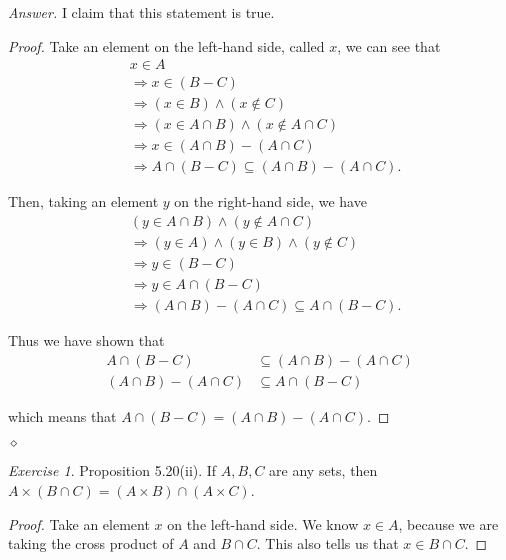 \documentclass[12pt,oneside]{amsart}
\theoremstyle{remark}
\newtheorem{exer}{Exercise}
\newenvironment{answer}{\bigskip\noindent\emph{Answer.}}{\hfill$\diamond$\newline}
\begin{document}
\begin{answer}
I claim that this statement is true.

\begin{proof}
Take an element on the left-hand side, called $x$, we can see that
\begin{align*}
&x \in A \tag{because $x \in A \cap (B - C)$} \\
&\Rightarrow  x \in (B - C) \tag{definition of $\cap$} \\
&\Rightarrow (x \in B) \wedge (x \notin C) \tag{definition of $-$} \\
&\Rightarrow (x \in A \cap B) \wedge (x \notin A \cap C) \\
&\Rightarrow x \in (A \cap B) - (A \cap C) \\
&\Rightarrow A \cap (B - C) \subseteq (A \cap B) - (A \cap C).
\end{align*}

Then, taking an element $y$ on the right-hand side, we have
\begin{align*}
&(y \in A \cap B) \wedge (y \notin A \cap C) \tag{definition of $-$} \\
&\Rightarrow (y \in A) \wedge (y \in B) \wedge (y \notin C) \tag{definition of $\cap$} \\
&\Rightarrow y \in (B - C) \\
&\Rightarrow y \in A \cap (B - C) \\
&\Rightarrow (A \cap B) - (A \cap C) \subseteq A \cap (B - C).
\end{align*}

Thus we have shown that
\begin{align*}
A \cap (B - C) &\subseteq (A \cap B) - (A \cap C) \\
(A \cap B) - (A \cap C) &\subseteq A \cap (B - C)
\end{align*}

which means that $A \cap (B - C) = (A \cap B) - (A \cap C)$.
\end{proof}
\end{answer}

%
%
%
%
\newpage
\begin{exer}
Proposition 5.20(ii). If $A, B, C$ are any sets, then $A \times (B \cap C) = (A \times B) \cap (A \times C)$.
\end{exer}

\begin{proof}
Take an element $x$ on the left-hand side. We know $x \in A$, because we are taking the cross product of $A$ and $B \cap C$. This also tells us that $x \in B \cap C$.
\end{proof}
\end{document}
